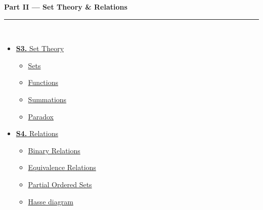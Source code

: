 \documentclass[12pt,a3paper]{article}
\begin{document}
\begin{tcolorbox}[breakable,colback=cB!5,colframe=cB,boxrule=1pt,arc=5pt,
  left=8pt,right=8pt,top=8pt,bottom=8pt,before skip=4pt]
  {\large\bfseries\textcolor{cB}{Part II --- Set Theory \& Relations}}\\[5pt]
  \textcolor{cB!40}{\rule{\textwidth}{0.4pt}}\\[3pt]
  \small\begin{itemize}[leftmargin=1.2em,itemsep=1pt,label={\textcolor{cB}{$\triangleright$}}]
    \item \hyperref[sec:S3]{\textbf{S3.} Set Theory}
      \begin{itemize}[leftmargin=1.5em,itemsep=0pt,label={\textcolor{cB}{$\cdot$}}]
        \item \hyperref[sub:s3-sets]{Sets}
        \item \hyperref[sub:s3-functions]{Functions}
        \item \hyperref[sub:s3-sum]{Summations}
        \item \hyperref[sub:s3-paradox]{Paradox}
      \end{itemize}
    \item \hyperref[sec:S4]{\textbf{S4.} Relations}
      \begin{itemize}[leftmargin=1.5em,itemsep=0pt,label={\textcolor{cB}{$\cdot$}}]
        \item \hyperref[sub:s4-relations]{Binary Relations}
        \item \hyperref[sub:s4-equivalence]{Equivalence Relations}
        \item \hyperref[sub:s4-poset]{Partial Ordered Sets}
        \item \hyperref[sub:s4-hasse]{Hasse diagram}
      \end{itemize}
  \end{itemize}
\end{tcolorbox}
\end{document}
